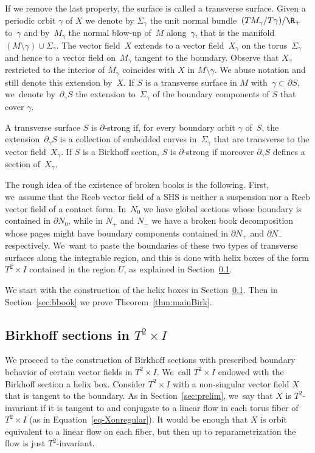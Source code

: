 If we remove the last property, the surface is called a transverse surface. Given a periodic orbit $\gamma$ of $X$ we denote by $\Sigma_\gamma$ the unit normal bundle~$(TM_\gamma/T\gamma)/\R_+$ to~$\gamma$ and by~$M_\gamma$ the normal blow-up of~$M$ along~$\gamma$, that is the manifold~$(M\setminus\gamma)\cup \Sigma_\gamma$.
The vector field~$X$ extends to a vector field~$X_\gamma$ on the torus~$\Sigma_\gamma$ and hence to a vector field on~$M_\gamma$ tangent to the boundary. Observe that $X_\gamma$ restricted to the interior of $M_\gamma$ coincides with $X$ in $M\setminus \gamma$.
We abuse notation and still denote this extension by~$X$.
If $S$ is a transverse surface in $M$ with~$\gamma \subset \partial S$, we~denote by~$\partial_\gamma S$ the extension to~$\Sigma_\gamma$ of the boundary components of $S$ that cover $\gamma$.

\begin{defi}\label{defn-strong}
A transverse surface $S$ is $\partial$-strong if, for every boundary orbit $\gamma$ of~$S$, the extension~$\partial_\gamma S$ is a collection of embedded curves in~$\Sigma_\gamma$ that are transverse to the vector field~$X_\gamma$.
If $S$ is a Birkhoff section, $S$ is $\partial$-strong if moreover $\partial_\gamma S$ defines a section of~$X_\gamma$.
\end{defi}

The rough idea of the existence of broken books is the following. First, we~assume that the Reeb vector field of a SHS is neither a suspension nor a Reeb vector field of a contact form. In~$N_0$ we have global sections whose boundary is contained in $\partial N_0$, while in $N_+$ and $N_-$ we have a broken book decomposition whose pages might have boundary components contained in $\partial N_+$ and $\partial N_-$ respectively. We~want to paste the boundaries of these two types of transverse surfaces along the integrable region, and this is done with helix boxes of the form $T^2\times I$ contained in the region $U$, as explained in Section~\ref{sec:gluing}.

We start with the construction of the helix boxes
in Section~\ref{sec:gluing}. Then in Section~\ref{sec:bbook} we prove Theorem~\ref{thm:mainBirk}.

\subsection{Birkhoff sections in $T^2\times I$}\label{sec:gluing}

We proceed to the construction of Birkhoff sections with prescribed boundary behavior of certain vector fields in $T^2\times I$. We~call $T^2\times I$ endowed with the Birkhoff section a helix box. Consider $T^2\times I$ with a non-singular vector field $X$ that is tangent to the boundary. As in Section~\ref{sec:prelim}, we~say that $X$ is $T^2$-invariant if it is tangent to and conjugate to a linear flow in each torus fiber of $T^2\times I$ (as in Equation~\eqref{eq-Xonregular}). It would be enough that $X$ is orbit equivalent to a linear flow on each fiber, but then up to reparametrization the flow is just $T^2$-invariant.

